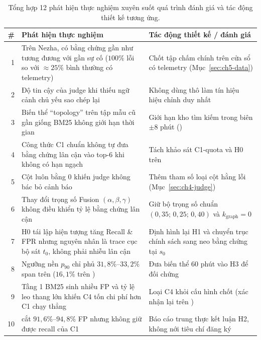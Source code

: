 \begin{table}[htbp]
  \centering
  \caption[Tổng hợp 12 phát hiện thực nghiệm và vai trò trong đề tài]{Tổng hợp 12 phát hiện thực nghiệm xuyên suốt quá trình đánh giá và tác động thiết kế tương ứng.}
  \label{tab:ch5-findings}
  \scriptsize
  \renewcommand{\arraystretch}{1.15}
  \setlength{\tabcolsep}{3.5pt}
  \begin{tabularx}{\linewidth}{@{}r Y >{\raggedright\arraybackslash}p{4.2cm}@{}}
    \toprule
    \textbf{\#} & \textbf{Phát hiện thực nghiệm} & \textbf{Tác động thiết kế / đánh giá} \\
     & Trên Nezha, có bằng chứng gần như tương đương với gần sự cố ($100\%$ lỗi so với $\approx 25\%$ bình thường có telemetry) & Chốt tập chấm chính trên cửa sổ có telemetry (Mục~\ref{sec:ch5-data}) \\
    2 & Độ tin cậy của judge khi thiếu ngữ cảnh chủ yếu sao chép lại  & Không dùng  thô làm tín hiệu hiệu chỉnh duy nhất \\
    3 & Biến thể ``topology'' trên tập mẫu cũ gần giống BM25 không giới hạn thời gian & Giới hạn kho tìm kiếm trong biên $\pm 8$ phút () \\
    4 & Công thức C1 chuẩn không tự đưa bằng chứng lân cận vào top-6 khi không có hạn ngạch & Tách khảo sát C1-quota và H0 trên  \\
    5 & Cột  luôn bằng $0$ khiến judge không bác bỏ cảnh báo & Thêm tham số  loại cột hằng lỗi (Mục~\ref{sec:ch4-judge}) \\
    6 & Thay đổi trọng số Fusion $(\alpha, \beta, \gamma)$ không điều khiển tỷ lệ bằng chứng lân cận & Giữ bộ trọng số chuẩn $(0{,}35;\, 0{,}25;\, 0{,}40)$ và $k_{\text{graph}} = 0$ \\
    7 & H0 tái lập hiện tượng tăng Recall \& FPR nhưng nguyên nhân là trace cục bộ sát $t_0$, không phải nhiễu lân cận & Định hình lại H1 và chuyển trục chính sách sang neo bằng chứng tại $s_0$ \\
    8 & Ngưỡng nền  $p_{90}$ chỉ phủ $31{,}8\%$--$33{,}2\%$ span trên  ($16{,}1\%$ trên ) & Đưa biến thể  60 phút vào H3 để đối chứng \\
    9 & Tầng 1 BM25 sinh nhiều FP và tỷ lệ leo thang lớn khiến C4 tốn chi phí hơn C1 chạy thẳng & Loại C4 khỏi cấu hình \CTAV{} chốt (xác nhận lại trên ) \\
    10 & \CTAV{} cắt $91{,}6\%$--$94{,}8\%$ FP nhưng không giữ được recall của C1 & Báo cáo trung thực kết luận H2, không nới tiêu chí đăng ký \\

\end{tabularx}
\end{table}
